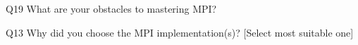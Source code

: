 \begin{description}%
\item{Q19} What are your obstacles to mastering MPI?%
\item{Q13} Why did you choose the MPI implementation(s)? [Select most suitable one]%
\end{description}%
